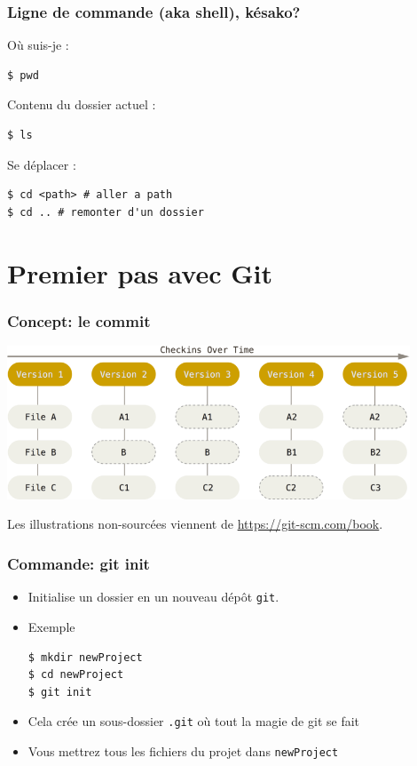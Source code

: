 \documentclass{beamer}
\begin{document}
\begin{frame}[fragile]
\frametitle{Ligne de commande (aka shell), késako?}
Où suis-je :
\begin{lstlisting}
$ pwd
\end{lstlisting}
Contenu du dossier actuel :
\begin{lstlisting}
$ ls
\end{lstlisting}
Se déplacer :
\begin{lstlisting}
$ cd <path> # aller a path
$ cd .. # remonter d'un dossier
\end{lstlisting}
\end{frame}

\section{Premier pas avec Git}

\begin{frame}
\frametitle{Concept: le \textbf{commit}}

\begin{center}
    \includegraphics[width=0.9\textwidth]{img/commits.png}
\end{center}
\footnotesize{Les illustrations non-sourcées viennent de \url{https://git-scm.com/book}.}
\end{frame}

\begin{frame}[fragile]
\frametitle{Commande: git init}
\begin{itemize}
\item Initialise un dossier en un nouveau dépôt \texttt{git}.
\item Exemple
\begin{lstlisting}
$ mkdir newProject
$ cd newProject
$ git init
\end{lstlisting}
\item Cela crée un sous-dossier \texttt{.git} où tout la magie de git se fait
\item Vous mettrez tous les fichiers du projet dans \texttt{newProject}
\end{itemize}
\end{frame}
\end{document}
